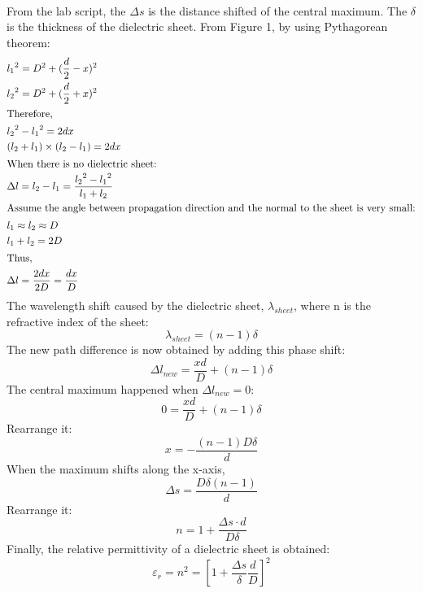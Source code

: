\documentclass[12pt]{article}
\begin{document}
    \paragraph{}
    From the lab script, the $\Delta s$ is the distance shifted of the central maximum. The $\delta$ is the thickness of the dielectric sheet\cite{4}. From Figure 1, by using Pythagorean theorem:
    \begin{align}
    &{l_1}^2 = D^2+(\frac{d}{2}-x)^2\\
    &{l_2}^2 = D^2+(\frac{d}{2}+x)^2\\
    \intertext{Therefore,} &{l_2}^2-{l_1}^2=2dx\\
    &(l_2+l_1)\times(l_2-l_1)=2dx\\
    \intertext{When there is no dielectric sheet:}
    &\Delta l = l_2 - l_1 = \frac{{l_2} ^2 - {l_1}^2}{l_1 + l_2}\\
    \intertext{Assume the angle between propagation direction and the normal to the sheet is very small:}
    &l_1\approx l_2 \approx D\\
    &l_1 + l_2 = 2D\\
    \intertext{Thus,} &\Delta l = \frac{2dx}{2D}= \frac{dx}{D}\\
    \end{align}
    The wavelength shift caused by the dielectric sheet, $\lambda _{sheet}$, where n is the refractive index of the sheet:
    \begin{equation}
    \lambda _{sheet}=(n-1)\delta    
    \end{equation}
    The new path difference is now obtained by adding this phase shift:
    \begin{equation}
        \Delta l_{new} = \frac{xd}{D}+(n-1)\delta
    \end{equation}
    The central maximum happened when $ \Delta l_{new}=0$:
    \begin{equation}
        0= \frac{xd}{D}+(n-1)\delta
    \end{equation}
    Rearrange it:
    \begin{equation}
        x=-\frac{(n-1)D\delta}{d}
    \end{equation}
    When the maximum shifts along the x-axis,
    \begin{equation}
        \Delta s = \frac{D\delta (n-1)}{d}
    \end{equation}
    Rearrange it:
    \begin{equation}
        n=1+\frac{\Delta s \cdot d}{D\delta}
    \end{equation}
    Finally, the relative permittivity of a dielectric sheet is obtained:
    \begin{equation}
        \varepsilon _r =n^2= \left[ 1 + \frac{\Delta s}{\delta} \frac{d}{D} \right] ^ 2
    \end{equation}
    
\end{document}
